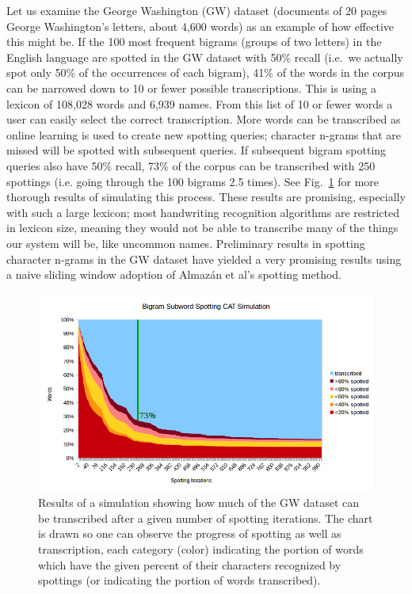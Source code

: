 \documentclass[conference]{IEEEtran}
\begin{document}
Let us examine the George Washington (GW) dataset\cite{GW} (documents of 20 pages George Washington's letters, about 4,600 words) as an example of how effective this might be. If the 100 most frequent bigrams (groups of two letters) in the English language are spotted in the GW dataset with 50\% recall (i.e.~we actually spot only 50\% of the occurrences of each bigram), 41\% of the words in the corpus can be narrowed down to 10 or fewer possible transcriptions. This is using a lexicon of 108,028 words and 6,939 names. From this list of 10 or fewer words a user can easily select the correct transcription. More words can be transcribed as online learning is used to create new spotting queries; character n-grams that are missed will be spotted with subsequent queries. If subsequent bigram spotting queries also have 50\% recall, 73\% of the corpus can be transcribed with 250 spottings (i.e. going through the 100 bigrams 2.5 times). See Fig.~\ref{fig:fullSim} for more thorough results of simulating this process. These results are promising, especially with such a large lexicon; most handwriting recognition algorithms are restricted in lexicon size, meaning they would not be able to transcribe many of the things our system will be, like uncommon names.  Preliminary results in spotting character n-grams in the GW dataset have yielded a very promising results using a naive sliding window adoption of Almaz\'{a}n et al's\cite{Almazan2014} spotting method.


\begin{figure}
    \centering
    \includegraphics[width=.49\textwidth]{simulationGraph_big_line}
    \caption{Results of a simulation showing how much of the GW dataset can be transcribed after a given number of spotting iterations. The chart is drawn so one can observe the progress of spotting as well as transcription, each category (color) indicating the portion of words which have the given percent of their characters recognized by spottings (or indicating the portion of words transcribed).}
    \label{fig:fullSim}
\end{figure}
\end{document}
